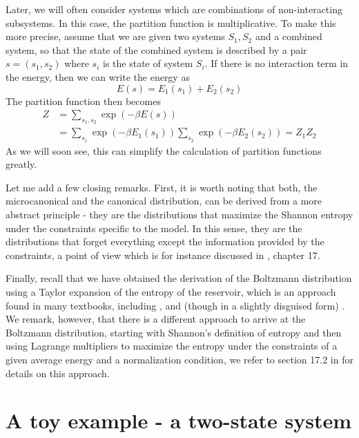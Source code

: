\documentclass[a4paper, draft]{article}
\theoremstyle{own}
\theoremstyle{remark}
\begin{document}
Later, we will often consider systems which are combinations of non-interacting subsystems. In this case, the partition function is multiplicative. To make this more precise, assume that we are given two systems $S_1, S_2$ and a combined system, so that the state of the combined system is described by a pair $s = (s_1, s_2)$ where $s_i$ is the state of system $S_i$. If there is no interaction term in the energy, then we can write the energy as
$$
E(s) = E_1(s_1) + E_2(s_2) 
$$
The partition function then becomes
\begin{align*}
Z &= \sum_{s_1, s_2} \exp(-\beta E(s)) \\
&= \sum_{s_1} \exp(- \beta E_1(s_1)) \sum_{s_2}  \exp(- \beta E_2(s_2)) = Z_1 Z_2
\end{align*}
As we will soon see, this can simplify the calculation of partition functions greatly.

Let me add a few closing remarks. First, it is worth noting that both, the microcanonical and the canonical distribution, can be derived from a more abstract principle - they are the distributions that maximize the Shannon entropy under the constraints specific to the model. In this sense, they are the distributions that forget everything except the information provided by the constraints, a point of view which is for instance discussed in \cite{Callen}, chapter 17.

Finally, recall that we have obtained the derivation of the Boltzmann distribution using a Taylor expansion of the entropy of the reservoir, which is an approach found in many textbooks, including \cite{Callen}, and (though in a slightly disguised form) \cite{Schroeder}. We remark, however, that there is a different approach to arrive at the Boltzmann distribution, starting with Shannon's definition of entropy and then using Lagrange multipliers to maximize the entropy under the constraints of a given average energy and a normalization condition, we refer to section 17.2 in \cite{Callen} for details on this approach.

\section{A toy example - a two-state system}
\end{document}
